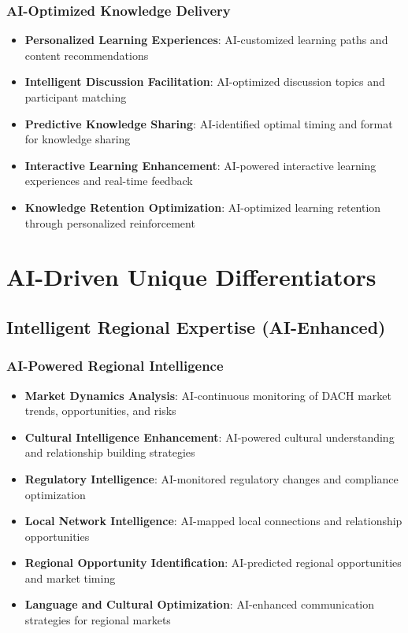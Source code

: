 \subsubsection{AI-Optimized Knowledge Delivery}

\begin{itemize}
    \item \textbf{Personalized Learning Experiences}: AI-customized learning paths and content recommendations
    \item \textbf{Intelligent Discussion Facilitation}: AI-optimized discussion topics and participant matching
    \item \textbf{Predictive Knowledge Sharing}: AI-identified optimal timing and format for knowledge sharing
    \item \textbf{Interactive Learning Enhancement}: AI-powered interactive learning experiences and real-time feedback
    \item \textbf{Knowledge Retention Optimization}: AI-optimized learning retention through personalized reinforcement
\end{itemize}

\section{AI-Driven Unique Differentiators}

\subsection{Intelligent Regional Expertise (AI-Enhanced)}

\subsubsection{AI-Powered Regional Intelligence}

\begin{itemize}
    \item \textbf{Market Dynamics Analysis}: AI-continuous monitoring of DACH market trends, opportunities, and risks
    \item \textbf{Cultural Intelligence Enhancement}: AI-powered cultural understanding and relationship building strategies
    \item \textbf{Regulatory Intelligence}: AI-monitored regulatory changes and compliance optimization
    \item \textbf{Local Network Intelligence}: AI-mapped local connections and relationship opportunities
    \item \textbf{Regional Opportunity Identification}: AI-predicted regional opportunities and market timing
    \item \textbf{Language and Cultural Optimization}: AI-enhanced communication strategies for regional markets
\end{itemize}

